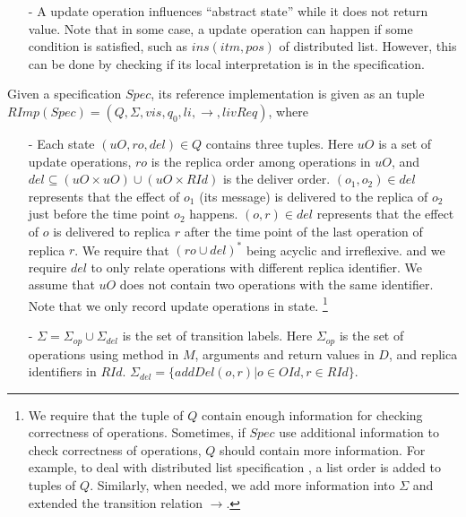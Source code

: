 {\begin{itemize}
    We require query method to be happen unconditionally. Or we can say, if $m$ is a query method, then the union of $Spec(m,\_,\_)$ is $PoSet_{\Sigma(M,D)}$.

\item[-] A update operation influences ``abstract state'' while it does not return value. {\color {red}Note that in some case, a update operation can happen if some condition is satisfied, such as $ins(itm,pos)$ of distributed list. However, this can be done by checking if its local interpretation is in the specification.}
\end{itemize}


Given a specification $Spec$, its reference implementation is given as an tuple $RImp(Spec) = (Q,\Sigma,vis,q_0,li,\rightarrow,livReq)$, where

\begin{itemize}
\setlength{\itemsep}{0.5pt}
\item[-] Each state $(uO,ro,del) \in Q$ contains three tuples. Here $uO$ is a set of update operations, $ro$ is the replica order among operations in $uO$, and $del \subseteq (uO \times uO) \cup (uO \times RId)$ is the deliver order. $(o_1,o_2) \in del$ represents that the effect of $o_1$ (its message) is delivered to the replica of $o_2$ just before the time point $o_2$ happens. $(o,r) \in del$ represents that the effect of $o$ is delivered to replica $r$ after the time point of the last operation of replica $r$. We require that $(ro \cup del)^*$ being acyclic and irreflexive. %
    and we require $del$ to only relate operations with different replica identifier. We assume that $uO$ does not contain two operations with the same identifier. Note that we only record update operations in state. \footnote{{\color {red}We require that the tuple of $Q$ contain enough information for checking correctness of operations. Sometimes, if $Spec$ use additional information to check correctness of operations, $Q$ should contain more information. For example, to deal with distributed list specification \cite{Attiya:2016}, a list order is added to tuples of $Q$. Similarly, when needed, we add more information into $\Sigma$ and extended the transition relation $\rightarrow$.}}

\item[-] $\Sigma = \Sigma_{op} \cup \Sigma_{del}$ is the set of transition labels. Here $\Sigma_{op}$ is the set of operations using method in $M$, arguments and return values in $D$, and replica identifiers in $RId$. %
    $\Sigma_{del}=\{ addDel(o,r) \vert o \in OId, r \in RId \}$.


\end{itemize}}
